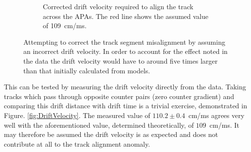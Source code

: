 \begin{figure}
\begin{subfigure}[t]{0.48\linewidth}
    \caption{Corrected drift velocity required to align the track across the APAs.  The red line shows the assumed value of 109~cm/ms.}
    \label{fig:TrackMisalignmentDriftVelocityRes}
  \end{subfigure}
  \caption[Attempting to correct the track segment misalignment by assuming an incorrect drift velocity.]{Attempting to correct the track segment misalignment by assuming an incorrect drift velocity.  In order to account for the effect noted in the data the drift velocity would have to around five times larger than that initially calculated from models.}
  \label{fig:TrackMisalignmentDriftVelocity}
\end{figure}

This can be tested by measuring the drift velocity directly from the data.  Taking tracks which pass through opposite counter pairs (zero counter gradient) and comparing this drift distance with drift time is a trivial exercise, demonstrated in Figure. \ref{fig:DriftVelocity}.  The measured value of $110.2\pm0.4$~cm/ms agrees very well with the aforementioned value, determined theoretically, of $109$~cm/ms.  It may therefore be assumed the drift velocity is as expected and does not contribute at all to the track alignment anomaly.

